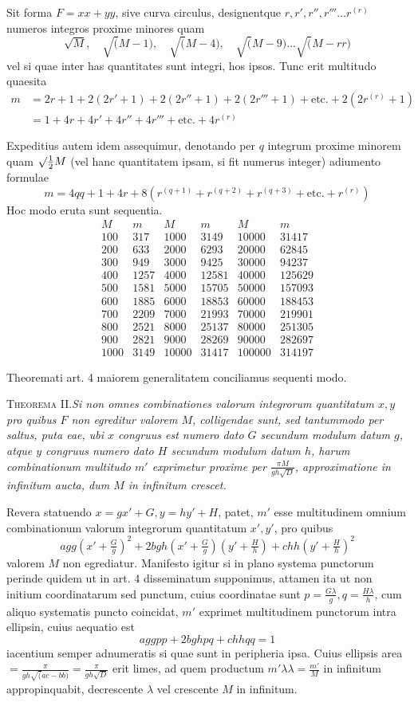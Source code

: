 Sit forma $F=xx+yy$, sive curva circulus, designentque $r,r',r'',r'''\ldots r^{(r)}$ numeros integros proxime minores quam
\[
\surd M,\quad\surd(M-1),\quad\surd(M-4),\quad\surd(M-9)\ldots\surd(M-rr)
\]
vel si quae inter has quantitates sunt integri, hos ipsos. Tunc erit multitudo quaesita
\[
\begin{aligned}
m&=2r+1+2(2r'+1)+2(2r''+1)+2(2r'''+1)+\text{etc.}+2(2r^{(r)}+1)\\
&=1+4r+4r'+4r''+4r'''+\text{etc.}+4r^{(r)}
\end{aligned}
\]

Expeditius autem idem assequimur, denotando per $q$ integrum proxime
minorem quam $\surd\tfrac12 M$ (vel hanc quantitatem ipsam, si fit numerus integer) adiumento formulae
\[
m=4qq+1+4r+8(r^{(q+1)}+r^{(q+2)}+r^{(q+3)}+\text{etc.}+r^{(r)})
\]
Hoc modo eruta sunt sequentia.
\[
\begin{array}{r|r||r|r||r|r}
M&m&M&m&M&m\\\hline
100&317&1000&3149&10000&31417\\
200&633&2000&6293&20000&62845\\
300&949&3000&9425&30000&94237\\
400&1257&4000&12581&40000&125629\\
500&1581&5000&15705&50000&157093\\
600&1885&6000&18853&60000&188453\\
700&2209&7000&21993&70000&219901\\
800&2521&8000&25137&80000&251305\\
900&2821&9000&28269&90000&282697\\
1000&3149&10000&31417&100000&314197
\end{array}
\]

Theoremati art. 4 maiorem generalitatem conciliamus sequenti modo.

\textsc{Theorema II.}\quad\emph{Si non omnes combinationes valorum integrorum quantitatum $x,y$ pro quibus $F$ non egreditur valorem $M$, colligendae sunt, sed tantummodo per saltus, puta eae, ubi $x$ congruus est numero dato $G$ secundum modulum datum $g$, atque $y$ congruus numero dato $H$ secundum modulum datum $h$, harum combinationum multitudo $m'$ exprimetur proxime per $\frac{\pi M}{gh\surd D}$, approximatione in infinitum aucta, dum $M$ in infinitum crescet.}

Revera statuendo $x=gx'+G,y=hy'+H$, patet, $m'$ esse multitudinem omnium combinationum valorum integrorum quantitatum $x',y'$, pro quibus
\[
agg(x'+\tfrac Gg)^2+2bgh(x'+\tfrac Gg)(y'+\tfrac Hh)+chh(y'+\tfrac Hh)^2
\]
valorem $M$ non egrediatur. Manifesto igitur si in plano systema punctorum perinde quidem ut in art. 4 disseminatum supponimus, attamen ita ut non initium coordinatarum sed punctum, cuius coordinatae sunt $p=\frac{G\lambda}g,q=\frac{H\lambda}h$, cum aliquo systematis puncto coincidat, $m'$ exprimet multitudinem punctorum intra 
ellipsin, cuius aequatio est
\[
aggpp+2bghpq+chhqq=1
\]
iacentium semper adnumeratis si quae sunt in peripheria ipsa. Cuius ellipsis area $=\frac\pi{gh\surd(ac-bb)}=\frac\pi{gh\surd D}$ erit limes, ad quem productum $m'\lambda\lambda=\frac{m'}M$ in infinitum appropinquabit, decrescente $\lambda$ vel crescente $M$ in infinitum.

